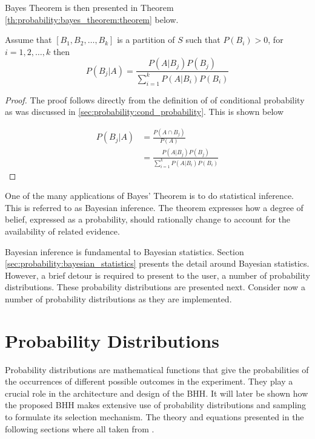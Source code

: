 Bayes Theorem is then presented in Theorem \ref{th:probability:bayes_theorem:theorem} below.

\begin{theorem}
    \label{th:probability:bayes_theorem:theorem}
    Assume that $[B_{1}, B_{2}, \dots, B_{k}]$ is a partition of $S$ such that $P(B_{i}) > 0$, for $i = 1,2, \dots, k$ then   
    \begin{equation*}
        P(B_{j} \vert A) = \frac{P(A \vert B_{j})P(B_{j})}{\sum_{i=1}^{k} P(A \vert B_{i})P(B_{i})}
    \end{equation*}
\end{theorem}

\begin{proof}
    The proof follows directly from the definition of of conditional probability as was discussed in \ref{sec:probability:cond_probability}. This is shown below
    
    \begin{equation*}
    \begin{split}
        P(B_{j} \vert A)
        &= \frac{P(A \cap B_{j})}{P(A)}\\
        &= \frac{P(A \vert B_{j})P(B_{j})}{\sum_{i=1}^{k} P(A \vert B_{i})P(B_{i})}
    \end{split}
    \end{equation*}
\end{proof}

One of the many applications of Bayes' Theorem is to do statistical inference. This is referred to as Bayesian inference. The theorem expresses how a degree of belief, expressed as a probability, should rationally change to account for the availability of related evidence. 

Bayesian inference is fundamental to Bayesian statistics. Section \ref{sec:probability:bayesian_statistics} presents the detail around Bayesian statistics. However, a brief detour is required to present to the user, a number of probability distributions. These probability distributions are presented next. Consider now a number of probability distributions as they are implemented.



\section{Probability Distributions}
\label{sec:probability:probability_distributions}

Probability distributions are mathematical functions that give the probabilities of the occurrences of different possible outcomes in the experiment. They play a crucial role in the architecture and design of the \ac{BHH}. It will later be shown how the proposed \ac{BHH} makes extensive use of probability distributions and sampling to formulate its selection mechanism. The theory and equations presented in the following sections where all taken from \citeauthor{ref:wackerly:2014} \cite{ref:wackerly:2014}. 



